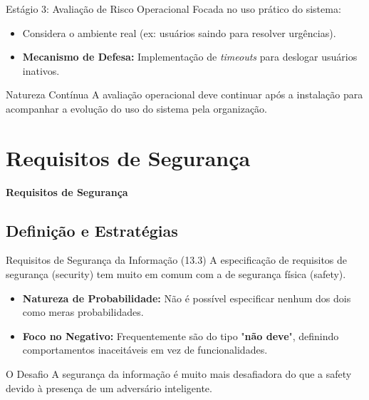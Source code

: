 \documentclass[aspectratio=169]{beamer}
\begin{document}
\begin{frame}{Estágio 3: Avaliação de Risco Operacional}
    Focada no uso prático do sistema:
    \begin{itemize}
        \item Considera o ambiente real (ex: usuários saindo para resolver urgências).
        \item \textbf{Mecanismo de Defesa:} Implementação de \textit{timeouts} para deslogar usuários inativos.
    \end{itemize}
    \begin{block}{Natureza Contínua}
        A avaliação operacional deve continuar após a instalação para acompanhar a evolução do uso do sistema pela organização.
    \end{block}
\end{frame}

\section{Requisitos de Segurança}
{
\begin{frame}[plain]
    \centering
    \Huge \color{white} \bfseries Requisitos de Segurança
\end{frame}
}

\subsection{Definição e Estratégias}
\begin{frame}{Requisitos de Segurança da Informação (13.3)}
    A especificação de requisitos de segurança (security) tem muito em comum com a de segurança física (safety).
    \begin{itemize}
        \item \textbf{Natureza de Probabilidade:} Não é possível especificar nenhum dos dois como meras probabilidades.
        \item \textbf{Foco no Negativo:} Frequentemente são do tipo "\textbf{não deve}", definindo comportamentos inaceitáveis em vez de funcionalidades.
    \end{itemize}
    \begin{block}{O Desafio}
        A segurança da informação é muito mais desafiadora do que a safety devido à presença de um adversário inteligente.
    \end{block}
\end{frame}
\end{document}
